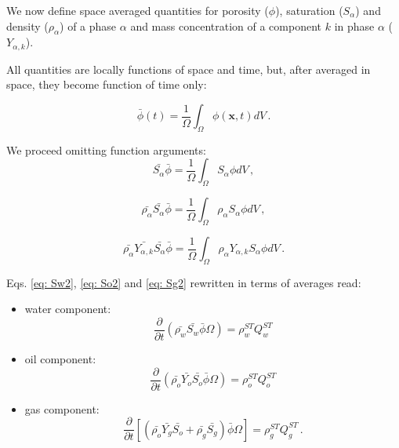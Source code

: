 \documentclass[authoryear,preprint,review,12pt]{elsarticle}
\begin{document}
We now define space averaged quantities for porosity ($\phi$), saturation ($S_\alpha$) and density ($\rho_\alpha$) of a phase $\alpha$ and mass concentration of a component $k$ in phase $\alpha$ ($Y_{\alpha,k}$).

All quantities are locally functions of space and time, but, after averaged in space, they become function of time only:

\begin{equation}
\bar{\phi} (t) = \frac{1}{\Omega}\int_{\Omega}\phi \left(\mathbf{x},t\right) dV \, .
\end{equation}

We proceed omitting function arguments:
\begin{equation}
\bar{S_\alpha}\bar{\phi} = \frac{1}{\Omega}\int_{\Omega}S_\alpha \phi dV \, ,
\end{equation}

\begin{equation}
\bar{\rho_\alpha}\bar{S_\alpha}\bar{\phi} = \frac{1}{\Omega}\int_{\Omega}\rho_\alpha S_\alpha \phi dV \, ,
\end{equation}

\begin{equation}
\bar{\rho_\alpha}\bar{Y_{\alpha,k}}\bar{S_\alpha}\bar{\phi} = \frac{1}{\Omega}\int_{\Omega}\rho_\alpha Y_{\alpha,k} S_\alpha \phi dV \, .
\end{equation}

Eqs. \eqref{eq: Sw2}, \eqref{eq: So2} and \eqref{eq: Sg2} rewritten in terms of averages read:

\begin{itemize}
\item water component:
\begin{equation}\label{eq: Sw3}
\frac{\partial}{\partial t} \left( \bar{\rho_w}\bar{S_w}\bar{\phi} \Omega \right) = \rho_w^{ST}Q_w^{ST}
\end{equation}

\item oil component:
\begin{equation}\label{eq: So3}
\frac{\partial}{\partial t} \left( \bar{\rho_o}\bar{Y_o}\bar{S_o}\bar{\phi} \Omega \right) = \rho_o^{ST}Q_o^{ST}
\end{equation}

\item gas component:
\begin{equation}\label{eq: Sg3}
\frac{\partial}{\partial t} \left[\left( \bar{\rho_o}\bar{Y_g} \bar{S_o} + \bar{\rho_g} \bar{S_g} \right) \bar{\phi} \Omega\right] = \rho_g^{ST}Q_g^{ST} \, .
\end{equation}
\end{itemize}
\end{document}
